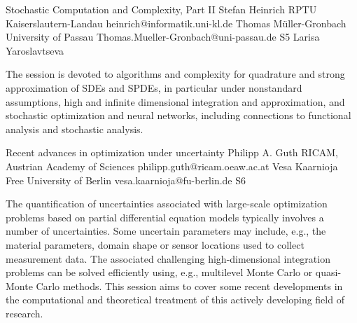 \begin{session}
 {Stochastic Computation and Complexity, Part II}%
 {Stefan Heinrich}%
 {RPTU Kaiserslautern-Landau}%
 {heinrich@informatik.uni-kl.de}%
 {Thomas M\"uller-Gronbach}%
 {University of Passau}%
 {Thomas.Mueller-Gronbach@uni-passau.de}%
 {S5}%
 {Larisa Yaroslavtseva}%

 The session is devoted to algorithms and complexity for
 quadrature and strong approximation of SDEs and SPDEs, in particular under nonstandard assumptions,
 high and infinite dimensional integration and approximation, and
 stochastic optimization and neural networks,
 including connections to functional analysis and stochastic analysis.
 \medskip
\end{session}



\clearpage

\begin{session}
 {Recent advances in optimization under uncertainty}%
 {Philipp A. Guth}%
 {RICAM, Austrian Academy of Sciences}%
 {philipp.guth@ricam.oeaw.ac.at}%
 {Vesa Kaarnioja}%
 {Free University of Berlin}%
 {vesa.kaarnioja@fu-berlin.de}%
 {S6}%
{}

 The quantification of uncertainties associated with large-scale optimization problems based on partial differential equation models typically involves a number of uncertainties. Some uncertain parameters may include, e.g., the material parameters, domain shape or sensor locations used to collect measurement data. The associated challenging high-dimensional integration problems can be solved efficiently using, e.g., multilevel Monte Carlo or quasi-Monte Carlo methods. This session aims to cover some recent developments in the computational and theoretical treatment of this actively developing field of research.
\end{session}

